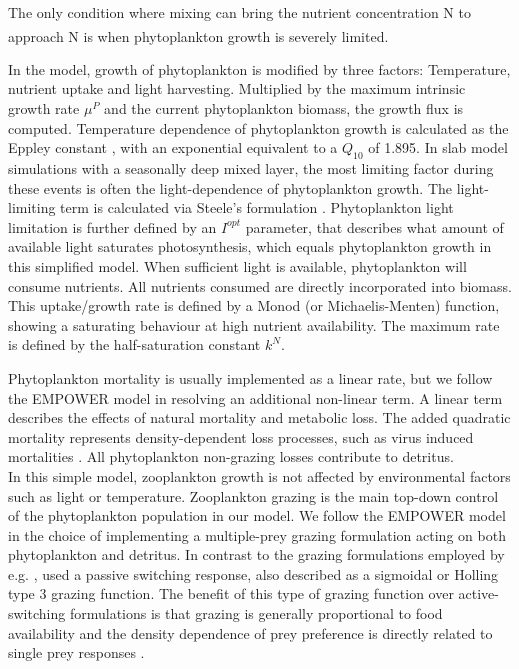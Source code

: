 \documentclass[template.tex]{subfiles}
\begin{document}
The only condition where mixing can bring the nutrient concentration N to approach \unit{N^\emptyset} is when phytoplankton growth is severely limited. 

In the model, growth of phytoplankton is modified by three factors: Temperature, nutrient uptake and light harvesting. Multiplied by the maximum intrinsic growth rate $\mu^P$ and the current phytoplankton biomass, the growth flux is computed. 
Temperature dependence of phytoplankton growth is calculated as the Eppley constant \citep{Eppley1972TemperatureSea}, with an exponential equivalent to a $Q_{10}$ of 1.895.
In slab model simulations with a seasonally deep mixed layer, the most limiting factor during these events is often the light-dependence of phytoplankton growth. The light-limiting term is calculated via Steele's formulation \citep{Steele1962EnvironmentalSea}. Phytoplankton light limitation is further defined by an $I^{opt}$ parameter, that describes what amount of available light saturates photosynthesis, which equals phytoplankton growth in this simplified model.
When sufficient light is available, phytoplankton will consume nutrients. All nutrients consumed are directly incorporated into biomass. This uptake/growth rate is defined by a Monod (or Michaelis-Menten) function, showing a saturating behaviour at high nutrient availability. The maximum rate is defined by the half-saturation constant $k^N$. 

Phytoplankton mortality is usually implemented as a linear rate, but we follow the EMPOWER model in resolving an additional non-linear term. A linear term describes the effects of natural mortality and metabolic loss. The added quadratic mortality represents density-dependent loss processes, such as virus induced mortalities \citep{Anderson2015c}.  
All phytoplankton non-grazing losses contribute to detritus.\\




In this simple model, zooplankton growth is not affected by environmental factors such as light or temperature.
Zooplankton grazing is the main top-down control of the phytoplankton population in our model. We follow the EMPOWER model in the choice of implementing a multiple-prey grazing formulation acting on both phytoplankton and detritus. In contrast to the grazing formulations employed by e.g. \cite{Fasham1990a}, \citeauthor{Anderson2015c} used a passive switching response, also described as a sigmoidal or Holling type 3 grazing function. The benefit of this type of grazing function over active-switching formulations is that grazing is generally proportional to food availability and the density dependence of prey preference is directly related to single prey responses \citep{Gentleman2003a}.
\end{document}
